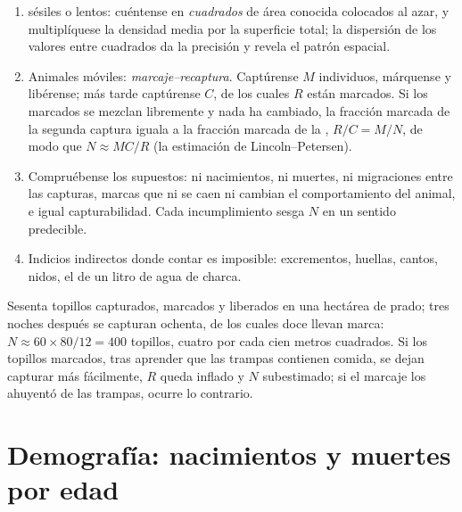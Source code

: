 \begin{method}\label{met:b1:populations:counting}
\begin{enumerate}
  \item {} sésiles o lentos: cuéntense en \emph{cuadrados} de área
        conocida colocados al azar, y multiplíquese la densidad media por la
        superficie total; la dispersión de los valores entre cuadrados da la
        precisión y revela el patrón espacial.
  \item Animales móviles: \emph{marcaje--recaptura}. Captúrense $M$
        individuos, márquense y libérense; más tarde captúrense $C$, de los
        cuales $R$ están marcados. Si los marcados se mezclan libremente y
        nada ha cambiado, la fracción marcada de la segunda captura iguala a
        la fracción marcada de la , $R/C = M/N$, de modo que
        $N \approx MC/R$ (la estimación de Lincoln--Petersen).
  \item Compruébense los supuestos: ni nacimientos, ni muertes, ni
        migraciones entre las capturas, marcas que ni se caen ni cambian el
        comportamiento del animal, e igual capturabilidad. Cada
        incumplimiento sesga $N$ en un sentido predecible.
  \item Indicios indirectos donde contar es imposible: excrementos, huellas,
        cantos, nidos, el  de un litro de agua de charca.
\end{enumerate}
\end{method}

\begin{example}\label{ex:b1:populations:voles}
Sesenta topillos capturados, marcados y liberados en una hectárea de prado;
tres noches después se capturan ochenta, de los cuales doce llevan marca:
$N \approx 60\times 80/12 = 400$ topillos, cuatro por cada cien metros
cuadrados. Si los topillos marcados, tras aprender que las trampas contienen
comida, se dejan capturar más fácilmente, $R$ queda inflado y $N$
subestimado; si el marcaje los ahuyentó de las trampas, ocurre lo contrario.
\end{example}

\section{Demografía: nacimientos y muertes por edad}

